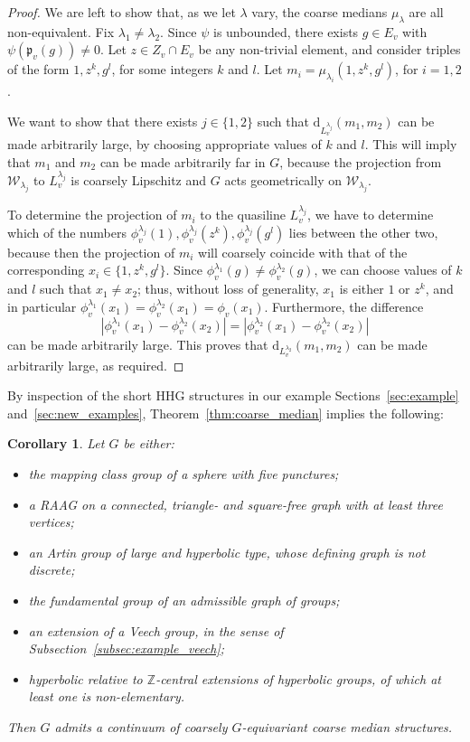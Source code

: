 \documentclass[svgnames]{amsart}
\theoremstyle{plain}
\newtheorem{cor}[thm]{Corollary}
\theoremstyle{definition}
\newcommand{\Z}{\mathbb{Z}}
\newcommand{\dist}{\mathrm{d}}
\newcommand{\W}{\mathcal{W}}
\begin{document}
\begin{proof}
We are left to show that, as we let $\lambda$ vary, the coarse medians $\mu_\lambda$ are all non-equivalent.  Fix $\lambda_1\neq \lambda_2$. Since $\psi$ is unbounded, there exists $g\in E_v$ with $\psi(\mathfrak p_v(g))\neq 0$. Let $z\in Z_v\cap E_v$ be any non-trivial element, and consider triples of the form $1,z^k, g^l$, for some integers $k$ and $l$. Let $m_i=\mu_{\lambda_i}(1,z^k, g^l)$, for $i=1,2$. 
 
We want to show that there exists $j\in \{1,2\}$ such that $\dist_{L^{\lambda_j}_v}(m_1, m_2)$ can be made arbitrarily large, by choosing appropriate values of $k$ and $l$. This will imply that $m_1$ and $m_2$ can be made arbitrarily far in $G$, because the projection from $\W_{\lambda_j}$ to  ${L^{\lambda_j}_v}$ is coarsely Lipschitz and $G$ acts geometrically on $\W_{\lambda_j}$.

To determine the projection of $m_i$ to the quasiline $L^{\lambda_j}_v$, we have to determine which of the numbers $\phi^{\lambda_j}_v(1),\phi^{\lambda_j}_v(z^k), \phi^{\lambda_j}_v(g^l)$ lies between the other two, because then the projection of $m_i$ will coarsely coincide with that of the corresponding $x_i\in\{1,z^k, g^l\}$. 
Since $\phi^{\lambda_1}_v(g)\neq \phi^{\lambda_2}_v(g)$, we can choose values of $k$ and $l$ such that $x_1\neq x_2$; thus, without loss of generality, $x_1$ is either $1$ or $z^k$, and in particular $\phi^{\lambda_1}_v(x_1)=\phi^{\lambda_2}_v(x_1)=\phi_v(x_1)$. Furthermore, the difference
$$|\phi^{\lambda_1}_v(x_1)-\phi^{\lambda_2}_v(x_2)|=|\phi^{\lambda_2}_v(x_1)-\phi^{\lambda_2}_v(x_2)|$$
can be made arbitrarily large. This proves that $\dist_{L^{\lambda_2}_v}(m_1, m_2)$ can be made arbitrarily large, as required. 
\end{proof}


By inspection of the short HHG structures in our example Sections~\ref{sec:example} and~\ref{sec:new_examples}, Theorem~\ref{thm:coarse_median} implies the following:
\begin{cor}\label{cor:coarsemedian_for_all}
    Let $G$ be either:
    \begin{itemize}
        \item the mapping class group of a sphere with five punctures;
        \item a RAAG on a connected, triangle- and square-free graph with at least three vertices;
        \item an Artin group of large and hyperbolic type, whose defining graph is not discrete;
        \item the fundamental group of an admissible graph of groups;
        \item an extension of a Veech group, in the sense of Subsection~\ref{subsec:example_veech};
        \item hyperbolic relative to $\Z$-central extensions of hyperbolic groups, of which at least one is non-elementary.
    \end{itemize}
    Then $G$ admits a continuum of coarsely $G$-equivariant coarse median structures.
\end{cor}
\end{document}
